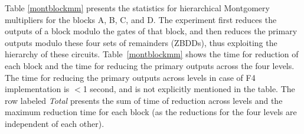 \par Table \ref{montblockmm} presents the
statistics for hierarchical Montgomery multipliers for the blocks A,
B, C, and D. The experiment first reduces the outputs of a block
modulo the gates of that block, and then reduces the primary outputs
modulo these four sets of remainders (ZBDDs), thus exploiting the
hierarchy of these circuits. Table~\ref{montblockmm} shows the time
for reduction of each block and the time for reducing the primary
outputs across the four levels. The  time for reducing the primary
outputs across  levels in case of F4 implementation is $<$1 second,
and is not explicitly mentioned in the table. The row labeled
\textit{Total} presents the sum of time of reduction across levels and
the maximum reduction time for each block (as the reductions for the
four levels are independent of each other). 

